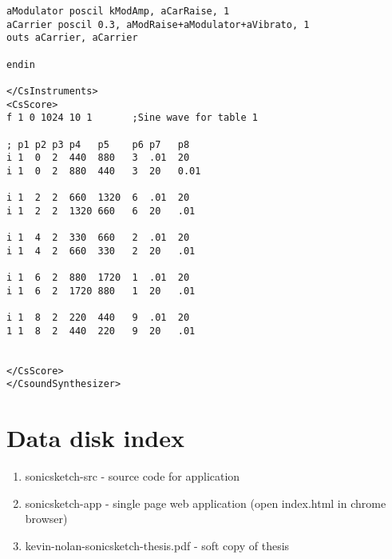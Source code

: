 \begin{appendices}
\begin{verbatim}
aModulator poscil kModAmp, aCarRaise, 1
aCarrier poscil 0.3, aModRaise+aModulator+aVibrato, 1
outs aCarrier, aCarrier

endin

</CsInstruments>
<CsScore>
f 1 0 1024 10 1       ;Sine wave for table 1

; p1 p2 p3 p4   p5    p6 p7   p8
i 1  0  2  440  880   3  .01  20
i 1  0  2  880  440   3  20   0.01

i 1  2  2  660  1320  6  .01  20
i 1  2  2  1320 660   6  20   .01

i 1  4  2  330  660   2  .01  20
i 1  4  2  660  330   2  20   .01

i 1  6  2  880  1720  1  .01  20
i 1  6  2  1720 880   1  20   .01

i 1  8  2  220  440   9  .01  20
1 1  8  2  440  220   9  20   .01


</CsScore>
</CsoundSynthesizer>
\end{verbatim}


\chapter{Data disk index}


\begin{enumerate}
\tightlist
\item
  sonicsketch-src - source code for application
\item
  sonicsketch-app - single page web application (open index.html in chrome browser)
\item
  kevin-nolan-sonicsketch-thesis.pdf - soft copy of thesis
\end{enumerate}

\end{appendices}